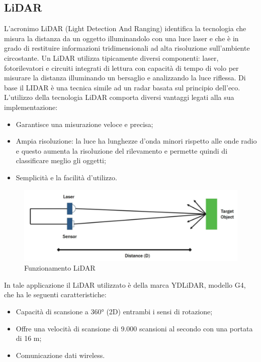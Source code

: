 \subsection{LiDAR}
L’acronimo LiDAR (Light Detection And Ranging) \cite{lidar} \cite{lidar2} identifica la tecnologia che  misura la distanza da un oggetto illuminandolo con una luce laser e che è  in grado di restituire informazioni tridimensionali ad alta risoluzione sull’ambiente circostante. Un LiDAR utilizza tipicamente diversi componenti: laser, fotorilevatori e circuiti integrati di lettura con capacità di tempo di volo per misurare la distanza illuminando un bersaglio e analizzando la luce riflessa.
Di base il LIDAR è una tecnica simile ad un radar basata sul principio dell'eco.\\
L’utilizzo della tecnologia LiDAR comporta diversi vantaggi legati alla sua implementazione:
\begin{itemize}
\item Garantisce una misurazione veloce e precisa;
\item Ampia risoluzione: la luce ha lunghezze d’onda minori rispetto alle onde radio e questo aumenta la risoluzione del rilevamento e permette quindi di classificare meglio gli oggetti;
\item Semplicità e la facilità d’utilizzo.
\end{itemize}

\begin{figure} [H]
    \centering
    \includegraphics[width=0.5\linewidth]{img/Lidar.PNG}
    \caption{Funzionamento LiDAR}
    \label{fig:Lidar}
\end{figure}
\noindent
In tale applicazione il LiDAR utilizzato è della marca YDLiDAR, modello G4, che ha le seguenti caratteristiche:
\begin{itemize}
\item Capacità di scansione a 360° (2D) entrambi i sensi di rotazione;
\item Offre una velocità di scansione di 9.000 scansioni al secondo con una portata di 16 m;
\item Comunicazione dati wireless.
\end{itemize}





